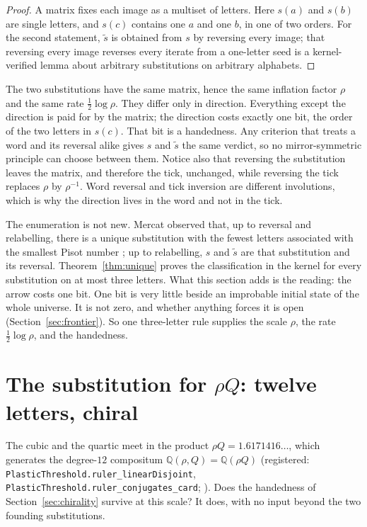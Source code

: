 \documentclass[11pt]{amsart}
\theoremstyle{plain}
\theoremstyle{definition}
\theoremstyle{remark}
\begin{document}
\begin{proof}
A matrix fixes each image as a multiset of letters. Here $s(a)$ and $s(b)$ are single
letters, and $s(c)$ contains one $a$ and one $b$, in one of two orders. For the second
statement, $\tilde s$ is obtained from $s$ by reversing every image; that reversing every
image reverses every iterate from a one-letter seed is a kernel-verified lemma about
arbitrary substitutions on arbitrary alphabets.
\end{proof}

The two substitutions have the same matrix, hence the same inflation factor $\rho$ and the
same rate $\tfrac12 \log \rho$. They differ only in direction. Everything except the direction
is paid for by the matrix; the direction costs exactly one bit, the order of the two letters
in $s(c)$. That bit is a handedness. Any criterion that treats a word and its reversal alike
gives $s$ and $\tilde s$ the same verdict, so no mirror-symmetric principle can choose
between them. Notice also that reversing the substitution leaves the matrix, and therefore
the tick, unchanged, while reversing the tick replaces $\rho$ by $\rho^{-1}$. Word reversal
and tick inversion are different involutions, which is why the direction lives in the word
and not in the tick.

The enumeration is not new. Mercat observed that, up to reversal and relabelling, there is a
unique substitution with the fewest letters associated with the smallest Pisot number
\cite{mercat2020}; up to relabelling, $s$ and $\tilde s$ are that substitution and its
reversal. Theorem~\ref{thm:unique} proves the classification in the kernel for every
substitution on at most three letters. What this
section adds is the reading: the arrow costs one bit. One bit is very little beside an
improbable initial state of the whole universe. It is not zero, and whether anything forces
it is open (Section~\ref{sec:frontier}). So one three-letter rule supplies the scale $\rho$,
the rate $\tfrac12 \log \rho$, and the handedness.

\section{The substitution for $\rho Q$: twelve letters, chiral}
\label{sec:rhoQ}

The cubic and the quartic meet in the product $\rho Q = 1.6171416\ldots$, which generates the
degree-$12$ compositum $\mathbb{Q}(\rho, Q) = \mathbb{Q}(\rho Q)$ (registered:
\texttt{PlasticThreshold.ruler\_linearDisjoint}, \texttt{PlasticThreshold.ruler\_conjugates\_card};
\cite{palomar-compositum}). Does the handedness of Section~\ref{sec:chirality} survive at this
scale? It does, with no input beyond the two founding substitutions.
\end{document}
